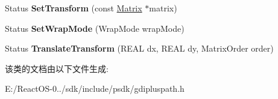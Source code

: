 \begin{DoxyCompactItemize}
\item 
\mbox{\label{class_path_gradient_brush_a83e0dd2ecda863051c50b5316f8122bd}} 
Status {\bfseries Set\+Transform} (const \hyperlink{class_matrix}{Matrix} $\ast$matrix)
\item 
\mbox{\label{class_path_gradient_brush_a886d59d24eab7c6f46f13b78492a8091}} 
Status {\bfseries Set\+Wrap\+Mode} (Wrap\+Mode wrap\+Mode)
\item 
\mbox{\label{class_path_gradient_brush_af6cafb24c7ccb832439c90f7cdb3869a}} 
Status {\bfseries Translate\+Transform} (R\+E\+AL dx, R\+E\+AL dy, Matrix\+Order order)
\end{DoxyCompactItemize}


该类的文档由以下文件生成\+:\begin{DoxyCompactItemize}
\item 
E\+:/\+React\+O\+S-\/0../sdk/include/psdk/gdipluspath.\+h\end{DoxyCompactItemize}
